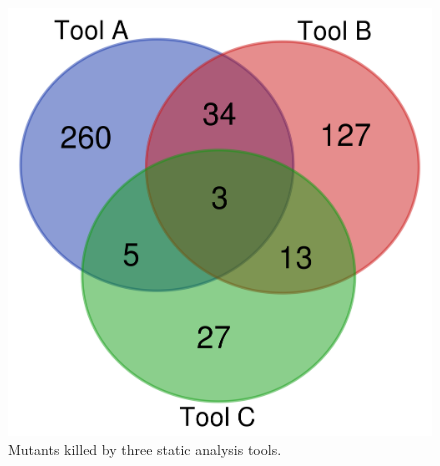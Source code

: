 \begin{figure}
  \includegraphics[width=0.8\columnwidth]{example.png}
  \caption{Mutants killed by three static analysis tools.}
  \label{fig:examplevenn}
\end{figure}

